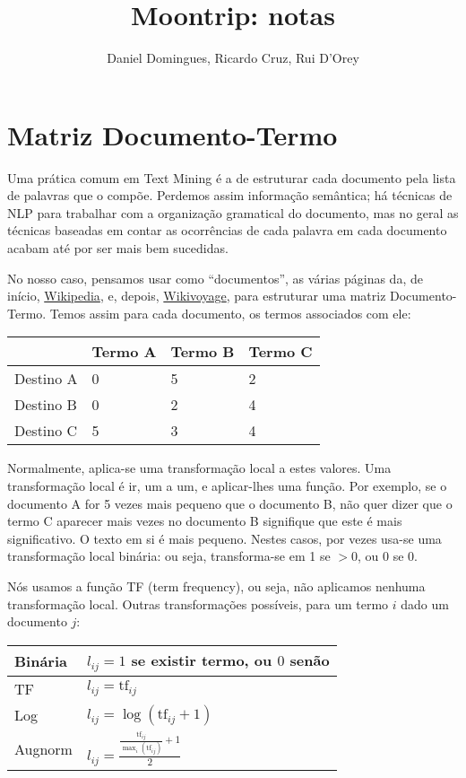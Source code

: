 \documentclass[twocolumn]{article}
\title{Moontrip: notas}
\author{Daniel Domingues, Ricardo Cruz, Rui D'Orey}
\begin{document}
\maketitle

\section{Matriz Documento-Termo}

Uma prática comum em Text Mining é a de estruturar cada documento pela lista de palavras que o compõe. Perdemos assim informação semântica; há técnicas de NLP para trabalhar com a organização gramatical do documento, mas no geral as técnicas baseadas em contar as ocorrências de cada palavra em cada documento acabam até por ser mais bem sucedidas.

No nosso caso, pensamos usar como ``documentos'', as várias páginas da, de início, \href{http://wikipedia.org}{Wikipedia}, e, depois, \href{http://wikivoyage.org}{Wikivoyage}, para estruturar uma matriz Documento-Termo. Temos assim para cada documento, os termos associados com ele:

\noindent
\begin{center}
\begin{tabular}{|l|l|l|l|}
\hline
	& Termo A & Termo B & Termo C \\\hline
	Destino A & 0 & 5 & 2 \\\hline
	Destino B & 0 & 2 & 4 \\\hline
	Destino C & 5 & 3 & 4 \\\hline
\end{tabular}
\end{center}

Normalmente, aplica-se uma transformação local a estes valores. Uma transformação local é ir, um a um, e aplicar-lhes uma função. Por exemplo, se o documento A for 5 vezes mais pequeno que o documento B, não quer dizer que o termo C aparecer mais vezes no documento B signifique que este é mais significativo. O texto em si é mais pequeno. Nestes casos, por vezes usa-se uma transformação local binária: ou seja, transforma-se em 1 se $> 0$, ou 0 se 0.

Nós usamos a função TF (term frequency), ou seja, não aplicamos nenhuma transformação local. Outras transformações possíveis, para um termo $i$ dado um documento $j$:

\noindent
\begin{center}
\begin{tabular}{|l|l|}
\hline
	Binária & $l_{ij}=1$ se existir termo, ou $0$ senão \\\hline
	TF & $l_{ij}=\mathrm{tf}_{ij}$ \\\hline
	Log & $l_{ij}=\log(\mathrm{tf}_{ij}+1)$ \\\hline
	Augnorm & $l_{ij}=\frac{\frac{\mathrm{tf}_{ij}}{\max_i(\mathrm{tf}_{ij})}+1}{2}$ \\\hline
\end{tabular}
\end{center}
\end{document}
